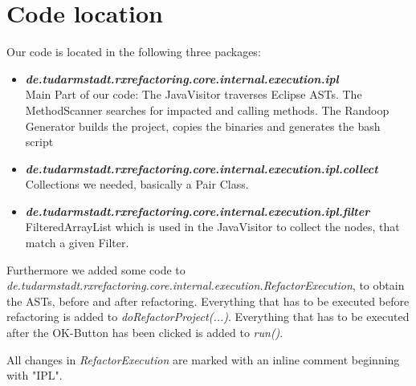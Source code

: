 \documentclass[accentcolor=tud9c, colorback]{tudreport}
\begin{document}
	\chapter{Code location}
		Our code is located in the following three packages:
		\begin{itemize}
			\item \textit{\textbf{de.tudarmstadt.rxrefactoring.core.internal.execution.ipl}}\\
				Main Part of our code: The JavaVisitor traverses Eclipse ASTs. The MethodScanner searches for impacted and calling methods. The Randoop Generator builds the project, copies the binaries and generates the bash script
			\item \textit{\textbf{de.tudarmstadt.rxrefactoring.core.internal.execution.ipl.collect}}\\
				Collections we needed, basically a Pair Class.
			\item \textit{\textbf{de.tudarmstadt.rxrefactoring.core.internal.execution.ipl.filter}}\\
				FilteredArrayList which is used in the JavaVisitor to collect the nodes, that match a given Filter.
		\end{itemize}
		Furthermore we added some code to \textit{de.tudarmstadt.rxrefactoring.core.internal.execution.RefactorExecution}, to obtain the ASTs, before and after refactoring. Everything that has to be executed before refactoring is added to \textit{doRefactorProject(...)}. Everything that has to be executed after the OK-Button has been clicked is added to \textit{run()}. 
		
		All changes in \textit{RefactorExecution} are marked with an inline comment beginning with "IPL".
\end{document}
